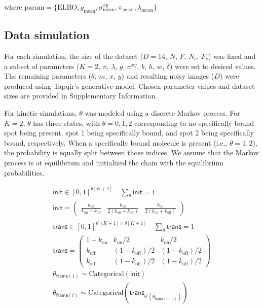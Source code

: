 \noindent where $\mathrm{param} = \{ \mathrm{ELBO}, g_\mathrm{mean}, \sigma^{xy}_\mathrm{mean}, \pi_\mathrm{mean}, \lambda_\mathrm{mean} \}$

\subsection*{Data simulation}

For each simulation, the size of the dataset ($D=14$, $N$, $F$, $N_c$, $F_c$) was fixed and a subset of parameters ($K=2$, $\pi$, $\lambda$, $g$, $\sigma^{xy}$, $b$, $h$, $w$, $\delta$) were set to desired values.  The remaining parameters ($\theta$, $m$, $x$, $y$) and resulting noisy images ($D$) were produced using Tapqir's generative model. Chosen parameter values and dataset sizes are provided in Supplementary Information.

For kinetic simulations, $\theta$ was modeled using a discrete Markov process. For $K=2$, $\theta$ has three states, with $\theta = 0, 1, 2$ corresponding to no specifically bound spot being present, spot 1 being specifically bound, and spot 2 being specifically bound, respectively. When a specifically bound molecule is present (i.e., $\theta = 1, 2$), the probability is equally split between those indices. We assume that the Markov process is at equilibrium and initialized the chain with the equilibrium probabilities.


\begin{gather*}
    \mathsf{init} \in [0, 1]^{\theta[K+1]} \quad \sum_{\theta} \mathsf{init} = 1 \\
    \mathsf{init} = \begin{pmatrix} \frac{k_\mathrm{off}}{k_\mathrm{on} + k_\mathrm{off}} & \frac{k_\mathrm{on}}{2\left( k_\mathrm{on} + k_\mathrm{off} \right)} & \frac{k_\mathrm{on}}{2\left( k_\mathrm{on} + k_\mathrm{off} \right)} \end{pmatrix} \\
    \mathsf{trans} \in [0, 1]^{\theta^\prime[K+1] \times \theta[K+1]} \quad \sum_{\theta} \mathsf{trans} = 1 \\
    \mathsf{trans} = \begin{pmatrix} 1 - k_\mathrm{on} & k_\mathrm{on}/2 & k_\mathrm{on}/2 \\ k_\mathrm{off} & (1 - k_\mathrm{off})/2 & (1 - k_\mathrm{off})/2 \\ k_\mathrm{off} & (1 - k_\mathrm{off})/2 & (1 - k_\mathrm{off})/2 \end{pmatrix} \\
    \theta_{\mathsf{frame}(1)} \sim \mathrm{Categorical(\mathsf{init})} \\
    \theta_{\mathsf{frame}(t)} \sim \mathrm{Categorical(\mathsf{trans}_{\theta^\prime( \theta_{\mathsf{frame}(t-1)})})}
\end{gather*}

